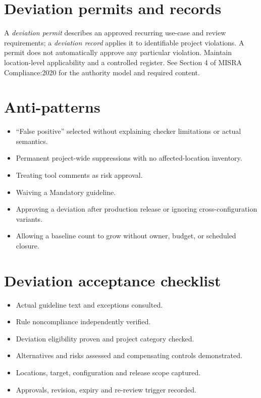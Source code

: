\documentclass[10pt,letterpaper]{article}
\begin{document}
\section{Deviation permits and records}
A \emph{deviation permit} describes an approved recurring use-case and review requirements; a \emph{deviation record} applies it to identifiable project violations. A permit does not automatically approve any particular violation. Maintain location-level applicability and a controlled register. See Section 4 of MISRA Compliance:2020 for the authority model and required content.
\section{Anti-patterns}
\begin{itemize}
\item ``False positive'' selected without explaining checker limitations or actual semantics.
\item Permanent project-wide suppressions with no affected-location inventory.
\item Treating tool comments as risk approval.
\item Waiving a Mandatory guideline.
\item Approving a deviation after production release or ignoring cross-configuration variants.
\item Allowing a baseline count to grow without owner, budget, or scheduled closure.
\end{itemize}
\section{Deviation acceptance checklist}
\begin{itemize}
\item[$\square$] Actual guideline text and exceptions consulted.
\item[$\square$] Rule noncompliance independently verified.
\item[$\square$] Deviation eligibility proven and project category checked.
\item[$\square$] Alternatives and risks assessed and compensating controls demonstrated.
\item[$\square$] Locations, target, configuration and release scope captured.
\item[$\square$] Approvals, revision, expiry and re-review trigger recorded.
\end{itemize}
\end{document}
